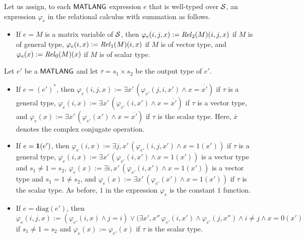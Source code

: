 Let us assign, to each $\mathsf{MATLANG}$ expression $e$ that is well-typed over $\mathcal{S}$, an expression $\varphi_e$ in the relational calculus with
summation as follows. 

\begin{itemize}
\item If $e = M$ is a matrix variable of $\mathcal{S}$, then $\varphi_e(i,j,x):=\mathit{Rel}_2(M)(i,j,x)$ if $M$ is of general type,
 $\varphi_e(i,x):=\mathit{Rel}_1(M)(i,x)$ if $M$ is of vector type, and $\varphi_e(x):=\mathit{Rel}_0(M)(x)$ if $M$ is of scalar type.
\end{itemize}
Let $e'$ be a $\mathsf{MATLANG}$ and let $\tau = s_1 \times s_2$ be the output type of $e'$.
\begin{itemize}
\item If $e = (e')^*$, then  $\varphi_e(i,j,x):=\exists x'\, (\varphi_{e'}(j,i,x')\land x=\overline{x'})$ if $\tau$ is a general type,
$\varphi_e(i,x):=\exists x'\, (\varphi_{e'}(i,x')\land x=\overline{x'})$ if $\tau$ is a vector type, and $\varphi_e(x):=\exists x'\, (\varphi_{e'}(x')\land x=\overline{x'})$ if $\tau$ is the scalar type.
Here, $\overline x$ denotes the complex conjugate operation.

\item If $e = \mathbf{1}(e')$, then $\varphi_e(i,x):=\exists j, x'\, (\varphi_{e'}(i,j,x')\land x=1(x'))$ if $\tau$ is a general type,
$\varphi_e(i,x):=\exists  x'\, (\varphi_{e'}(i,x')\land x=1(x'))$  is a vector type and $s_1\neq 1=s_2$, 
$\varphi_e(x):=\exists  i,x'\, (\varphi_{e'}(i,x')\land x=1(x'))$  is a vector type and $s_1=1\neq s_2$, 
and $\varphi_e(x):=\exists x'\, (\varphi_{e'}(x')\land x=1(x'))$  if $\tau$ is the scalar type. As before,  $1$ in the expression $\varphi_e$ is the constant $1$ function.


\item If $e = \mathrm{diag}(e')$, then $\varphi_e(i,j,x):=(\varphi_{e'}(i,x)\land j=i)\vee (\exists x',x''\, \varphi_{e'}(i,x')\land\varphi_{e'}(j,x'')\land i\neq j \land x=0(x')$
if $s_1 \neq 1 = s_2$ and  $\varphi_e(x):=\varphi_{e'}(x)$ if $\tau$ is the scalar type.



\end{itemize}
